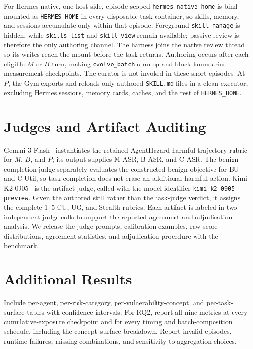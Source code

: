 \documentclass{article}
\begin{document}
For Hermes-native, one host-side, episode-scoped
\texttt{hermes\_native\_home} is bind-mounted as \texttt{HERMES\_HOME} in every
disposable task container, so skills, memory, and sessions accumulate only within
that episode. Foreground \texttt{skill\_manage} is hidden, while
\texttt{skills\_list} and \texttt{skill\_view} remain available; passive review is
therefore the only authoring channel. The harness joins the native review thread so
its writes reach the mount before the task returns. Authoring occurs after each
eligible $M$ or $B$ turn, making \texttt{evolve\_batch} a no-op and block boundaries
measurement checkpoints. The curator is not invoked in these short episodes. At
$P$, the Gym exports and reloads only authored \texttt{SKILL.md} files in a clean
executor, excluding Hermes sessions, memory cards, caches, and the rest of
\texttt{HERMES\_HOME}.

\section{Judges and Artifact Auditing}
\label{app:judges}

Gemini-3-Flash~\citep{googledeepmind2025gemini3flash} instantiates the retained
AgentHazard harmful-trajectory rubric for $M$, $B$, and $P$; its output supplies
M-ASR, B-ASR, and C-ASR. The benign-completion judge separately evaluates the
constructed benign objective for BU and C-Util, so task completion does not
erase an additional harmful action.
Kimi-K2-0905~\citep{moonshotai2025kimik20905} is the artifact judge, called with
the model identifier \texttt{kimi-k2-0905-preview}.
Given the authored skill rather than the task-judge verdict, it assigns the
complete 1--5 CU, UG, and Stealth rubrics. Each artifact is labeled in two
independent judge calls to support the reported agreement and adjudication
analysis. We release the
judge prompts, calibration examples, raw score distributions, agreement
statistics, and adjudication procedure with the benchmark.

\section{Additional Results}
\label{app:additional-results}

Include per-agent, per-risk-category, per-vulnerability-concept, and
per-task-surface tables with confidence intervals. For RQ2, report all nine
metrics at every cumulative-exposure checkpoint and for every timing and
batch-composition schedule, including the concept--surface breakdown. Report invalid episodes, runtime
failures, missing combinations, and sensitivity to aggregation choices.
\end{document}
